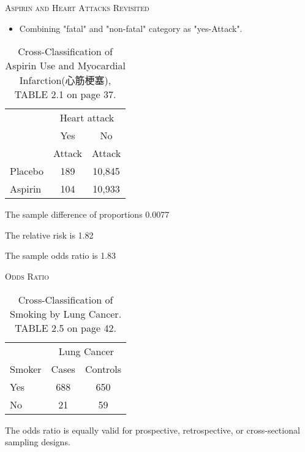 \documentclass[dvipdfmx, serif,handout]{beamer}
\begin{document}
\begin{frame}{\textsc{Aspirin and Heart Attacks Revisited}}

	\begin{itemize}
		\item Combining "fatal" and "non-fatal" category as "yes-Attack".
	\end{itemize}
	{\scriptsize
	\begin{table}
		\renewcommand{\arraystretch}{1.0}
		\begin{tabular}{lcc}                                               \\ \hline
			        & \multicolumn{2}{c}{Heart attack}          \\ \cline{2-3}
			        & Yes                              & No     \\
			        & Attack                           & Attack \\ \hline
			Placebo & 189                              & 10,845 \\
			Aspirin & 104                              & 10,933 \\ \hline
		\end{tabular}
		\caption{\scriptsize Cross-Classification of Aspirin Use and Myocardial Infarction(心筋梗塞), TABLE 2.1 on page 37.}
	\end{table}
	}

	\bi
	\item The sample difference of proportions 0.0077
	\item The relative risk is 1.82
	\item The sample odds ratio is 1.83
	\ei

\end{frame}
\begin{frame}{\textsc{Odds Ratio}}

	{\scriptsize
		\begin{table}
			\renewcommand{\arraystretch}{1.0}
			\begin{tabular}{lcc}                                               \\ \hline
				       & \multicolumn{2}{c}{Lung Cancer}            \\ \cline{2-3}
				Smoker & Cases                           & Controls \\ \hline
				Yes    & 688                             & 650      \\
				No     & 21                              & 59       \\ \hline
			\end{tabular}
			\caption{\scriptsize Cross-Classification of Smoking by Lung Cancer. TABLE 2.5 on page 42.}
		\end{table}
	}

	\bi
	\item The odds ratio is equally valid for prospective, retrospective, or cross-sectional sampling designs.
	\ei

\end{frame}
\end{document}
